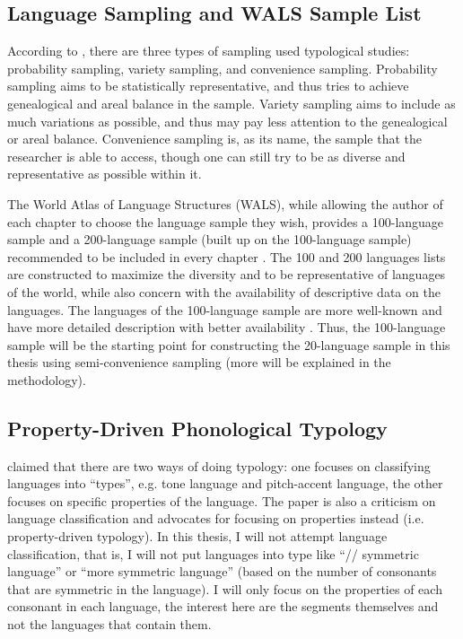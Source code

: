 \subsection{Language Sampling and WALS Sample List}

According to \citet{velupillai2012introduction}, there are three types of sampling used typological studies: probability sampling, variety sampling, and convenience sampling. Probability sampling aims to be statistically representative, and thus tries to achieve genealogical and areal balance in the sample. Variety sampling aims to include as much variations as possible, and thus may pay less attention to the genealogical or areal balance. Convenience sampling is, as its name, the sample that the researcher is able to access, though one can still try to be as diverse and representative as possible within it.

\par 
The World Atlas of Language Structures (WALS), while allowing the author of each chapter to choose the language sample they wish, provides a 100-language sample and a 200-language sample (built up on the 100-language sample) recommended to be included in every chapter \citep{wals-s1}. The 100 and 200 languages lists are constructed to maximize the diversity and to be representative of languages of the world, while also concern with the availability of descriptive data on the languages. The languages of the 100-language sample are more well-known and have more detailed description with better availability \citep{wals-s1}. Thus, the 100-language sample will be the starting point for constructing the 20-language sample in this thesis using semi-convenience sampling (more will be explained in the methodology).  

\subsection{Property-Driven Phonological Typology}

\citet{hyman2009not} claimed that there are two ways of doing typology: one focuses on classifying languages into ``types'', e.g. tone language and pitch-accent language, the other focuses on specific properties of the language. The paper is also a criticism on language classification and advocates for focusing on properties instead (i.e. property-driven typology). In this thesis, I will not attempt language classification, that is, I will not put languages into type like ``// symmetric language'' or ``more symmetric language'' (based on the number of consonants that are symmetric in the language). I will only focus on the properties of each consonant in each language, the interest here are the segments themselves and not the languages that contain them. 

